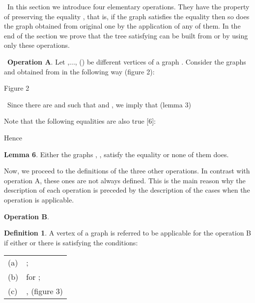 \documentclass{article}
\begin{document}
\bigskip

\ In this section we introduce four elementary operations. They have the
property of preserving the equality , that is, if the graph
satisfies the equality then so does the graph obtained from original one by
the application of any of them. In the end of the section we prove that the
tree  satisfying  can be built from  or  by using only these operations.

\bigskip

\ \textbf{Operation A}. Let ,..., () be different
vertices of a graph . Consider the graphs  and  obtained from  in the following way (figure 2):

\begin{center}

Figure 2\bigskip
\end{center}

\ Since there are 
and  such
that   and , we imply that (lemma 3)

\begin{center}

\end{center}

Note that the following equalities are also true [6]:

\begin{center}

\end{center}

Hence

\textbf{Lemma 6}. Either the graphs , , 
satisfy the equality  or none of them does.\bigskip

Now, we proceed to the definitions of the three other operations. In
contrast with operation A, these ones are not always defined. This is the
main reason why the description of each operation is preceded by the
description of the cases when the operation is applicable.

\bigskip

\textbf{Operation B}.

\textbf{Definition 1}. A vertex  of a graph  is referred to be
applicable for the operation B if either  or there is  satisfying the conditions:

\begin{tabular}{ll}
(a) & ; \\ 
(b) &  for ; \\ 
(c) & ,  (figure 3)\end{tabular}
\end{document}
